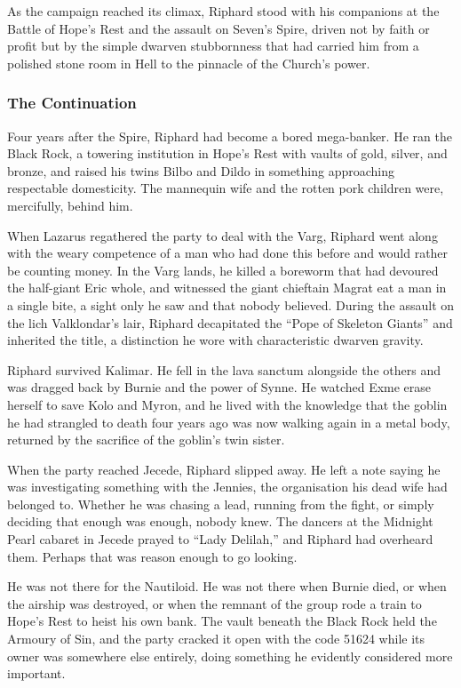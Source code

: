 As the campaign reached its climax, Riphard stood with his companions at the Battle of Hope's Rest and the assault on Seven's Spire, driven not by faith or profit but by the simple dwarven stubbornness that had carried him from a polished stone room in Hell to the pinnacle of the Church's power.

\subsubsection{The Continuation}

Four years after the Spire, Riphard had become a bored mega-banker.  He ran the Black Rock, a towering institution in Hope's Rest with vaults of gold, silver, and bronze, and raised his twins Bilbo and Dildo in something approaching respectable domesticity.  The mannequin wife and the rotten pork children were, mercifully, behind him.

When Lazarus regathered the party to deal with the Varg, Riphard went along with the weary competence of a man who had done this before and would rather be counting money.  In the Varg lands, he killed a boreworm that had devoured the half-giant Eric whole, and witnessed the giant chieftain Magrat eat a man in a single bite, a sight only he saw and that nobody believed.  During the assault on the lich Valklondar's lair, Riphard decapitated the ``Pope of Skeleton Giants'' and inherited the title, a distinction he wore with characteristic dwarven gravity.

Riphard survived Kalimar.  He fell in the lava sanctum alongside the others and was dragged back by Burnie and the power of Synne.  He watched Exme erase herself to save Kolo and Myron, and he lived with the knowledge that the goblin he had strangled to death four years ago was now walking again in a metal body, returned by the sacrifice of the goblin's twin sister.

When the party reached Jecede, Riphard slipped away.  He left a note saying he was investigating something with the Jennies, the organisation his dead wife had belonged to.  Whether he was chasing a lead, running from the fight, or simply deciding that enough was enough, nobody knew.  The dancers at the Midnight Pearl cabaret in Jecede prayed to ``Lady Delilah,'' and Riphard had overheard them.  Perhaps that was reason enough to go looking.

He was not there for the Nautiloid.  He was not there when Burnie died, or when the airship was destroyed, or when the remnant of the group rode a train to Hope's Rest to heist his own bank.  The vault beneath the Black Rock held the Armoury of Sin, and the party cracked it open with the code 51624 while its owner was somewhere else entirely, doing something he evidently considered more important.

